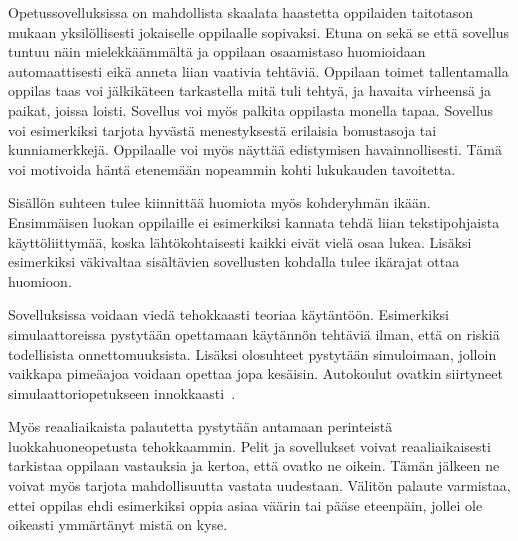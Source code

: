 \documentclass[utf8,bachelor]{gradu3}
\begin{document}

Opetussovelluksissa on mahdollista skaalata haastetta oppilaiden taitotason mukaan yksilöllisesti jokaiselle oppilaalle sopivaksi. Etuna on sekä se että sovellus tuntuu näin mielekkäämmältä ja oppilaan osaamistaso huomioidaan automaattisesti eikä anneta liian vaativia tehtäviä. Oppilaan toimet tallentamalla oppilas taas voi jälkikäteen tarkastella mitä tuli tehtyä, ja havaita virheensä ja paikat, joissa loisti. Sovellus voi myös palkita oppilasta monella tapaa. Sovellus voi esimerkiksi tarjota hyvästä menestyksestä erilaisia bonustasoja tai kunniamerkkejä. Oppilaalle voi myös näyttää edistymisen havainnollisesti. Tämä voi motivoida häntä etenemään nopeammin kohti lukukauden tavoitetta.~\parencite[][]{koulunArki, gamePaper}

Sisällön suhteen tulee kiinnittää huomiota myös kohderyhmän ikään. Ensimmäisen luokan oppilaille ei esimerkiksi kannata tehdä liian tekstipohjaista käyttöliittymää, koska lähtökohtaisesti kaikki eivät vielä osaa lukea. Lisäksi esimerkiksi väkivaltaa sisältävien sovellusten kohdalla tulee ikärajat ottaa huomioon.


Sovelluksissa voidaan viedä tehokkaasti teoriaa käytäntöön. Esimerkiksi simulaattoreissa pystytään opettamaan käytännön tehtäviä ilman, että on riskiä todellisista onnettomuuksista. Lisäksi olosuhteet pystytään simuloimaan, jolloin vaikkapa pimeäajoa voidaan opettaa jopa kesäisin. Autokoulut ovatkin siirtyneet simulaattoriopetukseen innokkaasti~\parencite[][]{simut}.

Myös reaaliaikaista palautetta pystytään antamaan perinteistä luokkahuoneopetusta tehokkaammin. Pelit ja sovellukset voivat reaaliaikaisesti tarkistaa oppilaan vastauksia ja kertoa, että ovatko ne oikein. Tämän jälkeen ne voivat myös tarjota mahdollisuutta vastata uudestaan. Välitön palaute varmistaa, ettei oppilas ehdi esimerkiksi oppia asiaa väärin tai pääse eteenpäin, jollei ole oikeasti ymmärtänyt mistä on kyse.
\end{document}
